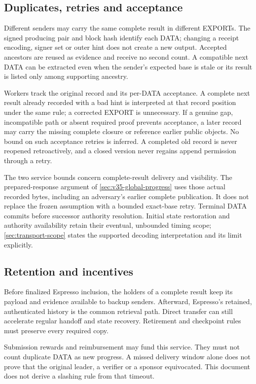 \documentclass[11pt,a4paper]{article}
\begin{document}
\subsection{Duplicates, retries and acceptance}
Different senders may carry the same complete result in different EXPORTs.
The signed producing pair and block hash identify each DATA; changing a
receipt encoding, signer set or outer hint does not create a new output.
Accepted ancestors are reused as evidence and receive no second count.
A compatible next DATA can be extracted even when the sender's expected
base is stale or its result is listed only among supporting ancestry.

Workers track the original record and its per-DATA acceptance. A complete
next result already recorded with a bad hint is interpreted at that
record position under the same rule; a corrected EXPORT is unnecessary.
If a genuine gap, incompatible path or absent required proof prevents
acceptance, a later record may carry the missing complete closure or
reference earlier public objects. No bound on such acceptance retries
is inferred. A completed old record is never reopened retroactively,
and a closed version never regains append permission through a retry.

The two service bounds concern complete-result delivery and visibility.
The prepared-response argument of \cref{sec:v35-global-progress} uses
those actual recorded bytes, including an adversary's earlier complete
publication. It does not replace the frozen assumption with a bounded
exact-base retry. Terminal DATA commits before successor authority
resolution. Initial state restoration and authority availability retain
their eventual, unbounded timing scope; \cref{sec:transport-scope} states
the supported decoding interpretation and its limit explicitly.

\subsection{Retention and incentives}
Before finalized Espresso inclusion, the holders of a complete result
keep its payload and evidence available to backup senders. Afterward,
Espresso's retained, authenticated history is the common retrieval path.
Direct transfer can still accelerate regular handoff and state recovery.
Retirement and checkpoint rules must preserve every required copy.

Submission rewards and reimbursement may fund this service. They must not
count duplicate DATA as new progress. A missed delivery window alone does
not prove that the original leader, a verifier or a sponsor equivocated.
This document does not derive a slashing rule from that timeout.
\end{document}
